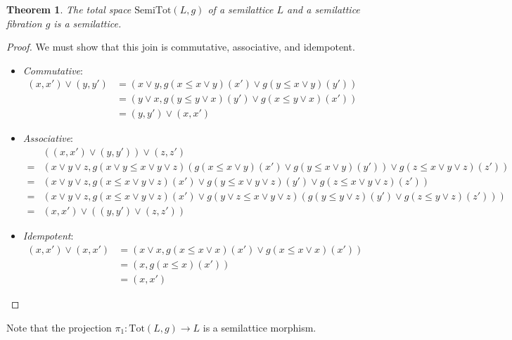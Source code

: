 \documentclass{article}
\newtheorem{theorem}{Theorem}
\begin{document}
      \begin{theorem}
        The total space $\mathrm{SemiTot}(L, g)$ of a semilattice $L$ and a semilattice fibration $g$ is a semilattice.
      \end{theorem}
      \begin{proof}
        We must show that this join is commutative, associative, and idempotent.
        \begin{itemize}
          \item \emph{Commutative}:
            \begin{align*}
              (x, x') \vee (y, y') &= \left(x \vee y, g(x \leq x \vee y)(x') \vee g(y \leq x \vee y)(y')\right) \\
              &= \left(y \vee x, g(y \leq y \vee x)(y') \vee g(x \leq y \vee x)(x')\right) \\
              &= (y, y') \vee (x, x')
            \end{align*}
          \item \emph{Associative}:
            \begin{align*} &((x, x') \vee (y, y')) \vee (z, z')  \\
              =& \left(x \vee y \vee z, g(x \vee y \leq x \vee y \vee z)(g(x \leq x \vee y)(x') \vee g(y \leq x \vee y)(y')) \vee g(z \leq x \vee y \vee z)(z')\right) \\
              =& \left(x \vee y \vee z, g(x \leq x \vee y \vee z)(x') \vee g(y \leq x \vee y \vee z)(y') \vee g(z \leq x \vee y \vee z)(z')\right) \\
              =& \left(x \vee y \vee z, g(x \leq x \vee y \vee z)(x') \vee g(y \vee z \leq x \vee y \vee z)(g(y \leq y \vee z)(y') \vee g(z \leq y \vee z)(z'))\right) \\
              =& (x, x') \vee ((y, y') \vee (z, z'))
            \end{align*}
          \item \emph{Idempotent}: 
            \begin{align*}
              (x, x') \vee (x, x') &= \left(x \vee x, g(x \leq x \vee x)(x') \vee g(x \leq x \vee x)(x')\right) \\
              &= \left(x, g(x \leq x)(x')\right) \\
              &= (x, x')
            \end{align*}
        \end{itemize}
      \end{proof}

      Note that the projection $\pi_1 : \mathrm{Tot}(L, g) \rightarrow L$ is a semilattice morphism.
\end{document}
